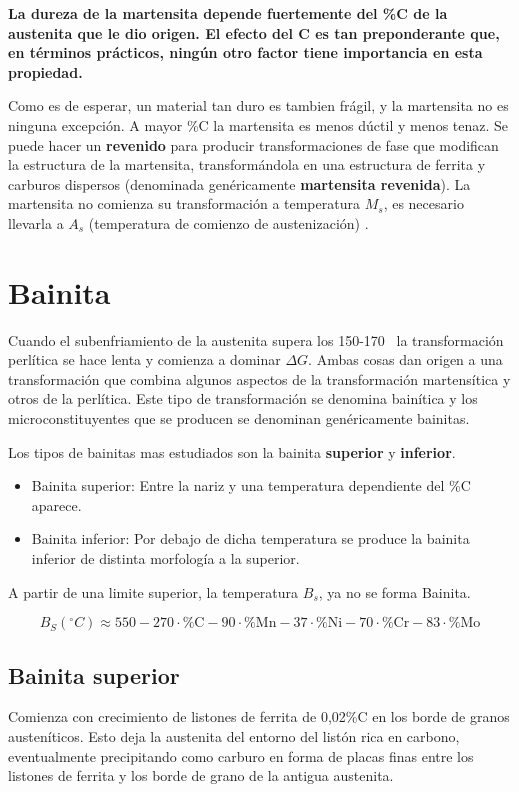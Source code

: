\textbf{La dureza de la martensita depende fuertemente del \%C de la austenita que le dio origen. El efecto del C es tan preponderante que, en términos prácticos, ningún otro factor tiene importancia en esta propiedad.}

Como es de esperar, un material tan duro es tambien frágil, y la martensita no es ninguna excepción. A mayor \%C la martensita es menos dúctil y menos tenaz. Se puede hacer un \textbf{revenido} para producir transformaciones de fase que modifican la estructura de la martensita, transformándola en una estructura de ferrita y carburos dispersos (denominada genéricamente \textbf{martensita revenida}). La martensita no comienza su transformación a temperatura $M_s$, es necesario llevarla a $A_s$ (temperatura de comienzo de austenización) \cite{gottstein2013physical}.

\section{Bainita}

Cuando el subenfriamiento de la austenita supera los 150-170\grad~ la transformación perlítica se hace lenta y comienza a dominar $\Delta G$. Ambas cosas dan origen a una transformación que combina algunos aspectos de la transformación martensítica y otros de la perlítica. Este tipo de transformación se denomina bainítica y los microconstituyentes que se producen se denominan genéricamente bainitas.

Los tipos de bainitas mas estudiados son la bainita \textbf{superior} y \textbf{inferior}.

\begin{itemize}
    \item Bainita superior: Entre la nariz y una temperatura dependiente del \%C aparece.
    \item Bainita inferior: Por debajo de dicha temperatura se produce la bainita inferior de distinta morfología a la superior.
\end{itemize}

A partir de una limite superior, la temperatura $B_s$, ya no se forma Bainita.

\[
B_{S}\left(^{\circ} C\right)\approx550-270 \cdot\%\mathrm{C}-90\cdot\%\mathrm{Mn}-37 \cdot\%\mathrm{Ni}-70 \cdot\%\mathrm{Cr}-83\cdot\%\mathrm{Mo}
\]

\subsection{Bainita superior}
Comienza con crecimiento de listones de ferrita de 0,02\%C en los borde de granos austeníticos. Esto deja la austenita del entorno del listón rica en carbono, eventualmente precipitando como carburo en forma de placas finas entre los listones de ferrita y los borde de grano de la antigua austenita.

